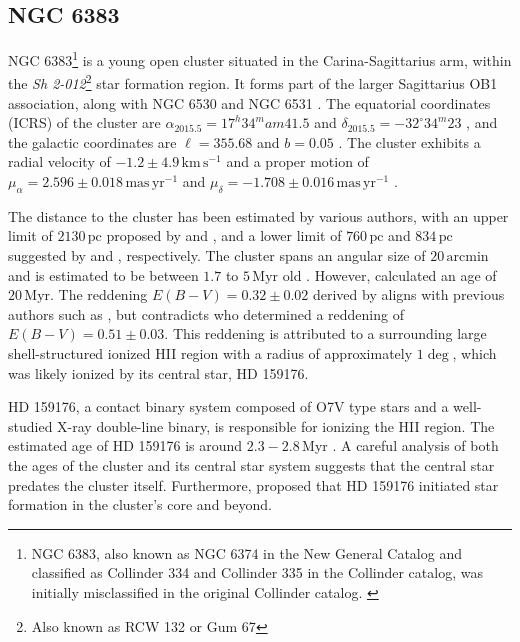 \documentclass[fleqn,usenatbib,usedcolumn,useAMS]{mnras}
\newcommand{\kms}{\,\textrm{km}\,\textrm{s}^{-1}} %
\begin{document}
\subsection{NGC 6383}

NGC 6383\footnote{NGC 6383, also known as NGC 6374 in the New General Catalog and classified as Collinder 334 and Collinder 335 in the Collinder catalog, was initially misclassified in the original Collinder catalog. \citep{1931AnLun...2....1C}} is a young open cluster situated in the Carina-Sagittarius arm, within the \textit{Sh 2-012}\footnote{Also known as RCW 132 \citep{1960MNRAS.121..103R} or Gum 67} star formation region. It forms part of the larger Sagittarius OB1 association, along with NGC 6530 and NGC 6531 \citep{2008hsf2.book..497R}. The equatorial coordinates (ICRS) of the cluster are $\alpha_{2015.5} = 17^h34^mam41.5$ and $\delta_{2015.5} = -32^\circ34^m23$ \citep{2020A&A...633A..99C}, and the galactic coordinates are $\ell = 355.68$ and $b= 0.05$ \citep{2017A&A...600A.106C}. The cluster exhibits a radial velocity of $-1.2 \pm 4.9\kms$ \citep{2017A&A...600A.106C} and a proper motion of $\mu_\alpha = 2.596 \pm 0.018\,\textrm{mas}\,\textrm{yr}^{-1}$ and $\mu_\delta = -1.708\pm 0.016\, \textrm{mas}\,\textrm{yr}^{-1}$ \citep{2020A&A...633A..99C}.

The distance to the cluster has been estimated by various authors, with an upper limit of $2130\,\textrm{pc}$ proposed by \citet{1930LicOB..14..154T} and \citet{1937LicOB..18...89Z}, and a lower limit of $760\,\textrm{pc}$ and $834\,\textrm{pc}$ suggested by \citet{1949ApJ...110..117S} and \citet{2018A&A...610A..30A}, respectively. The cluster spans an angular size of $20\,\textrm{arcmin}$ \citep{2013A&A...560A..76M} and is estimated to be between $1.7$ to $5\,\textrm{Myr}$ old \citep{1978MNRAS.182..607F,1989MNRAS.236..263P,1991MNRAS.249...76B,2005A&A...438.1163K,2007A&A...462..157P}. However, \citet{1968ArA.....5....1L} calculated an age of $20\,\textrm{Myr}$. The reddening $E(B-V) = 0.32 \pm 0.02$ derived by \citet{2008hsf2.book..497R} aligns with previous authors such as \citet{1971A&AS....4..241B,1978MNRAS.182..607F,1978MNRAS.184..661L,1985A&A...151..391T,1989MNRAS.236..263P,1994RMxAA..29..141F,2007A&A...462..157P}, but contradicts \citet{2018A&A...610A..30A} who determined a reddening of $E(B-V) = 0.51 \pm 0.03$. This reddening is attributed to a surrounding large shell-structured ionized HII region with a radius of approximately $1\deg$, which was likely ionized by its central star, HD 159176.

HD 159176, a contact binary system composed of O7V type stars and a well-studied X-ray double-line binary, is responsible for ionizing the HII region. The estimated age of HD 159176 is around $2.3-2.8$\,\textrm{Myr} \citep{2010A&A...511A..25R}. A careful analysis of both the ages of the cluster and its central star system suggests that the central star predates the cluster itself. Furthermore, \citet{1978MNRAS.182..607F} proposed that HD 159176 initiated star formation in the cluster's core and beyond.
\end{document}
